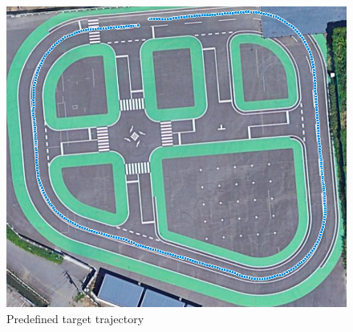 \begin{figure}[H]
  \centering
 \includegraphics[keepaspectratio, scale=0.3]
      {images/targetpath.png}
 \caption{Predefined target trajectory}
 \label{fig:target path}
\end{figure}


\newpage